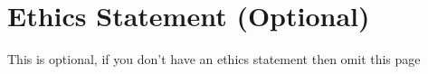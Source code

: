 \section*{Ethics Statement (Optional)}
This is optional, if you don't have an ethics statement then omit this page
\pagebreak